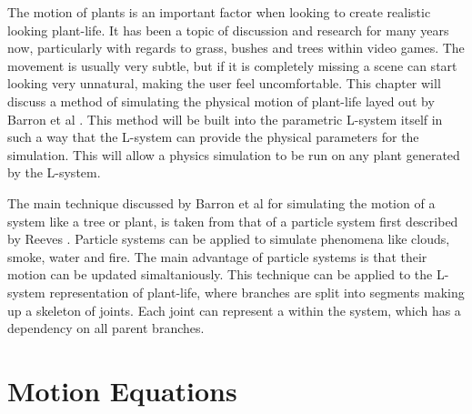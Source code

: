 

\lettrine[lines=3]{T}{}he motion of plants is an important factor when looking to create realistic looking plant-life. It has been a topic of discussion and research for many years now, particularly with regards to grass, bushes and trees within video games. The movement is usually very subtle, but if it is completely missing a scene can start looking very unnatural, making the user feel uncomfortable. This chapter will discuss a method of simulating the physical motion of plant-life layed out by Barron et al \cite{barron2001real}. This method will be built into the parametric L-system itself in such a way that the L-system can provide the physical parameters for the simulation. This will allow a physics simulation to be run on any plant generated by the L-system.

The main technique discussed by Barron et al for simulating the motion of a system like a tree or plant, is taken from that of a particle system first described by Reeves \cite{reeves1983particle}. Particle systems can be applied to simulate phenomena like clouds, smoke, water and fire. The main advantage of particle systems is that their motion can be updated simaltaniously. This technique can be applied to the L-system representation of plant-life, where branches are split into segments making up a skeleton of joints. Each joint can represent a  within the system, which has a dependency on all parent branches.

\section{Motion Equations}


